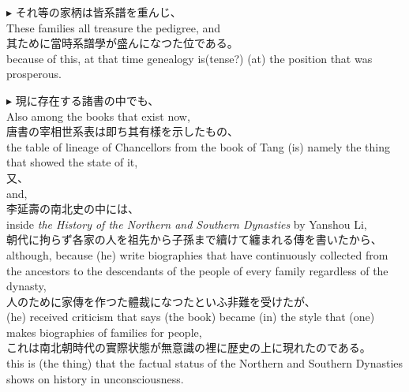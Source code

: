 \documentclass{ctexart}
\makeatletter
\newcommand*{\shifttext}[1]{%
  \settowidth{\@tempdima}{#1}%
  \hspace{-\@tempdima}#1%
}
\newcommand{\plabel}[1]{%
\shifttext{\textbf{#1}\quad}%
}
\makeatother
\begin{document}
\vspace{1em}
\plabel{$\blacktriangleright$}%
それ等の家柄は皆系譜を重んじ、\\
These families all treasure the pedigree, and\\
其ために當時系譜學が盛んになつた位である。\\
because of this, at that time genealogy is(tense?) (at) the position that was prosperous.

\vspace{1em}
\plabel{$\blacktriangleright$}%
現に存在する諸書の中でも、\\
Also among the books that exist now,\\
唐書の宰相世系表は即ち其有樣を示したもの、\\
the table of lineage of Chancellors from the book of Tang (is) namely the thing that showed the state of it,\\
又、\\
and,\\
李延壽の南北史の中には、\\
inside \textit{the History of the Northern and Southern Dynasties} by Yanshou Li,\\
朝代に拘らず各家の人を祖先から子孫まで續けて纏まれる傳を書いたから、\\
although, because (he) write biographies that have continuously collected from the ancestors to the descendants of the people of every family regardless of the dynasty,\\
人のために家傳を作つた體裁になつたといふ非難を受けたが、\\
(he) received criticism that says (the book) became (in) the style that (one) makes biographies of families for people,\\
これは南北朝時代の實際状態が無意識の裡に歴史の上に現れたのである。\\
this is (the thing) that the factual status of the Northern and Southern Dynasties shows on history in unconsciousness.
\end{document}
